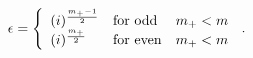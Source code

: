 \begin{equation}
\epsilon =\left\{
\begin{array}{lll}
(i)^{\frac{{m}_{+}-1}{2}}&{\rm for~ odd}&{m}_{+}<m\\
(i)^{\frac{{m}_{+}}{2}}&{\rm for~ even}&{m}_{+}<m\\
\end{array}\right.\,.
\end{equation}

